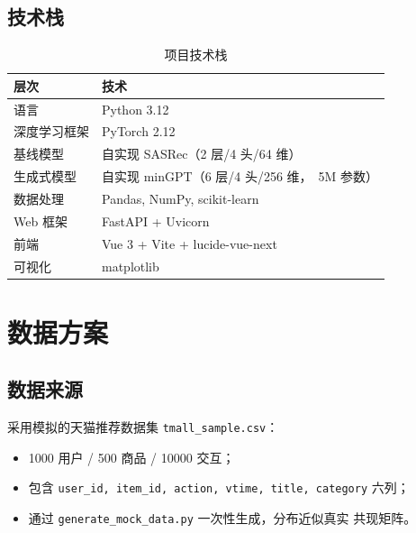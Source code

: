 \documentclass[12pt,a4paper]{article}
\begin{document}
\subsection{技术栈}
\begin{table}[ht]
    \centering
    \begin{tabular}{ll}
        \toprule
        \textbf{层次} & \textbf{技术} \\
        \midrule
        语言 & Python 3.12 \\
        深度学习框架 & PyTorch 2.12 \\
        基线模型 & 自实现 SASRec（2 层/4 头/64 维）\\
        生成式模型 & 自实现 minGPT（6 层/4 头/256 维，~5M 参数）\\
        数据处理 & Pandas, NumPy, scikit-learn \\
        Web 框架 & FastAPI + Uvicorn \\
        前端 & Vue 3 + Vite + lucide-vue-next \\
        可视化 & matplotlib \\
        \bottomrule
    \end{tabular}
    \caption{项目技术栈}
\end{table}

\section{数据方案}

\subsection{数据来源}
采用模拟的天猫推荐数据集 \texttt{tmall\_sample.csv}：
\begin{itemize}[leftmargin=2em]
    \item 1000 用户 / 500 商品 / 10000 交互；
    \item 包含 \texttt{user\_id, item\_id, action, vtime, title, category} 六列；
    \item 通过 \texttt{generate\_mock\_data.py} 一次性生成，分布近似真实
          共现矩阵。
\end{itemize}
\end{document}
